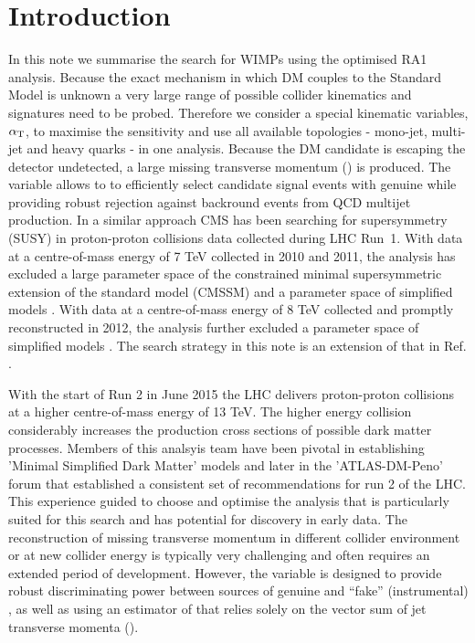 \section{Introduction}
\label{sec:intro}

In this note we summarise the search for WIMPs using the optimised RA1 analysis.
Because the exact mechanism in which DM couples to the Standard Model is unknown a very large range of possible collider kinematics 
and signatures need to be probed. Therefore we consider a special kinematic variables,  $\alpha_{\textrm T}$, to maximise
 the sensitivity and use all available topologies - mono-jet, multi-jet and heavy quarks - in one analysis. 
Because the DM candidate is escaping the detector undetected, a large missing transverse momentum (\MET) is produced.
The \alphat variable allows to to efficiently select candidate signal events with genuine \MET while
providing robust rejection against backround events from QCD multijet production. 
In a similar approach CMS has been searching for supersymmetry (SUSY) in proton-proton collisions data collected during LHC Run~1. With data at a centre-of-mass energy of 7 TeV collected in
2010 and 2011, the \alphat analysis has excluded a large parameter space of the constrained minimal supersymmetric extension of the
standard model (CMSSM) \cite{Khachatryan:2011tk, Chatrchyan:2011zy, Chatrchyan:2012wa} and a parameter space of simplified models
\cite{Chatrchyan:2012wa}. With data at a centre-of-mass energy of 8 TeV collected and promptly reconstructed in 2012, the \alphat analysis
further excluded a parameter space of simplified models \cite{Chatrchyan:2013lya}. 
The search strategy in this note is an extension of that in Ref. \cite{CMS_AN_2013-366}.

With the start of Run 2 in June 2015 the LHC delivers proton-proton collisions at a higher centre-of-mass
energy of 13 TeV. The higher energy collision considerably increases the production cross sections of possible dark matter processes.
Members of this analsyis team have been pivotal in establishing 'Minimal Simplified Dark Matter' models and later in the 'ATLAS-DM-Peno' forum that established a consistent set of recommendations for run 2 of the LHC. This experience guided to choose and optimise the \alphat analysis that is particularly suited for this search and has potential for
discovery in early data. The reconstruction of missing transverse momentum in different collider 
environment or at new collider energy is typically very challenging and often requires an extended period of
development. However, the \alphat variable is designed to provide robust discriminating power between sources of genuine and ``fake''
(\eg instrumental) \met, as well as using an estimator of \met that
relies solely on the vector sum of jet transverse momenta (\mht).

